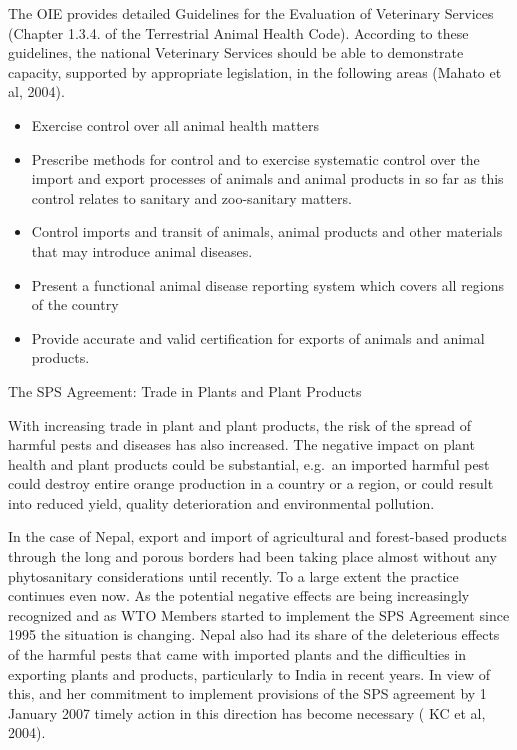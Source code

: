 \documentclass[
  openany]{book}
\providecommand{\tightlist}{%
  \setlength{\itemsep}{0pt}\setlength{\parskip}{0pt}}
\begin{document}
The OIE provides detailed Guidelines for the Evaluation of Veterinary Services (Chapter 1.3.4. of the Terrestrial Animal Health Code). According to these guidelines, the national Veterinary Services should be able to demonstrate capacity, supported by appropriate legislation, in the following areas (Mahato et al, 2004).

\begin{itemize}
\tightlist
\item
  Exercise control over all animal health matters
\item
  Prescribe methods for control and to exercise systematic control over the import and export processes of animals and animal products in so far as this control relates to sanitary and zoo-sanitary matters.
\item
  Control imports and transit of animals, animal products and other materials that may introduce animal diseases.
\item
  Present a functional animal disease reporting system which covers all regions of the country
\item
  Provide accurate and valid certification for exports of animals and animal products.
\end{itemize}

The SPS Agreement: Trade in Plants and Plant Products

With increasing trade in plant and plant products, the risk of the spread of harmful pests and diseases has also increased. The negative impact on plant health and plant products could be substantial, e.g.~an imported harmful pest could destroy entire orange production in a country or a region, or could result into reduced yield, quality deterioration and environmental pollution.

In the case of Nepal, export and import of agricultural and forest-based products through the long and porous borders had been taking place almost without any phytosanitary considerations until recently. To a large extent the practice continues even now. As the potential negative effects are being increasingly recognized and as WTO Members started to implement the SPS Agreement since 1995 the situation is changing. Nepal also had its share of the deleterious effects of the harmful pests that came with imported plants and the difficulties in exporting plants and products, particularly to India in recent years. In view of this, and her commitment to implement provisions of the SPS agreement by 1 January 2007 timely action in this direction has become necessary ( KC et al, 2004).
\end{document}

